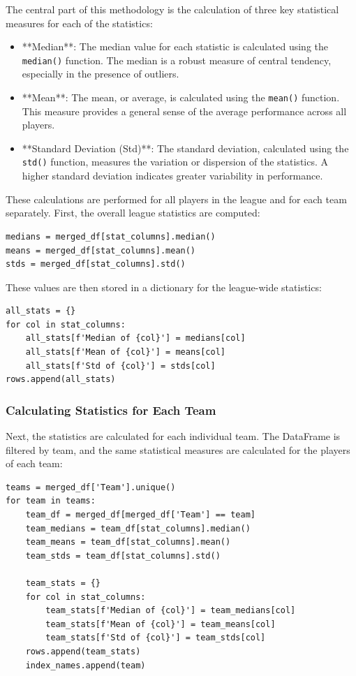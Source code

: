 \documentclass[a4paper,12pt]{article}
\begin{document}
The central part of this methodology is the calculation of three key statistical measures for each of the statistics:

\begin{itemize}
    \item **Median**: The median value for each statistic is calculated using the \texttt{median()} function. The median is a robust measure of central tendency, especially in the presence of outliers.
    \item **Mean**: The mean, or average, is calculated using the \texttt{mean()} function. This measure provides a general sense of the average performance across all players.
    \item **Standard Deviation (Std)**: The standard deviation, calculated using the \texttt{std()} function, measures the variation or dispersion of the statistics. A higher standard deviation indicates greater variability in performance.
\end{itemize}

These calculations are performed for all players in the league and for each team separately. First, the overall league statistics are computed:

\begin{verbatim}
medians = merged_df[stat_columns].median()
means = merged_df[stat_columns].mean()
stds = merged_df[stat_columns].std()
\end{verbatim}

These values are then stored in a dictionary for the league-wide statistics:

\begin{verbatim}
all_stats = {}
for col in stat_columns:
    all_stats[f'Median of {col}'] = medians[col]
    all_stats[f'Mean of {col}'] = means[col]
    all_stats[f'Std of {col}'] = stds[col]
rows.append(all_stats)
\end{verbatim}

\subsubsection{Calculating Statistics for Each Team}

Next, the statistics are calculated for each individual team. The DataFrame is filtered by team, and the same statistical measures are calculated for the players of each team:

\begin{verbatim}
teams = merged_df['Team'].unique()
for team in teams:
    team_df = merged_df[merged_df['Team'] == team]
    team_medians = team_df[stat_columns].median()
    team_means = team_df[stat_columns].mean()
    team_stds = team_df[stat_columns].std()

    team_stats = {}
    for col in stat_columns:
        team_stats[f'Median of {col}'] = team_medians[col]
        team_stats[f'Mean of {col}'] = team_means[col]
        team_stats[f'Std of {col}'] = team_stds[col]
    rows.append(team_stats)
    index_names.append(team)
\end{verbatim}
\end{document}
